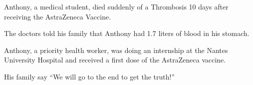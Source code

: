 Anthony, a medical student, died suddenly of a Thrombosis 10 days after
receiving the AstraZeneca Vaccine.

The doctors told his family that Anthony had 1.7 liters of blood in his stomach.

Anthony, a priority health worker, was doing an internship at the Nantes
University Hospital and received a first dose of the AstraZeneca vaccine.

His family say “We will go to the end to get the truth!”

